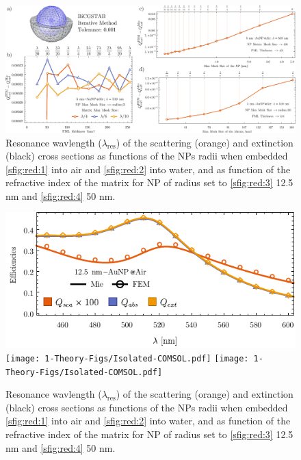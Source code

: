 

\begin{figure}\centering
\includegraphics[scale = .8 ]{1-Theory-Figs/drawingCOMSOL.pdf}
\caption[Convergence tests: The Meshing]{Resonance wavlength ($\lambda_\text{res}$) of the scattering (orange) and extinction (black) cross sections as functions of the NPs radii when embedded  \ref{sfig:red:1} into air and \ref{sfig:red:2} into water, and as function of the refractive index of the matrix for NP of radius set to  \ref{sfig:red:3} 12.5 nm and \ref{sfig:red:4} 50 nm.}
\end{figure}

\clearpage

\begin{figure}\centering
\includegraphics[width = .8\textwidth ]{1-Theory-Figs/Mie-FEM_Air.pdf}\\
\texttt{[image: 1-Theory-Figs/Isolated-COMSOL.pdf]}%
\texttt{[image: 1-Theory-Figs/Isolated-COMSOL.pdf]}%
\caption[Convergence tests: The Meshing]{Resonance wavlength ($\lambda_\text{res}$) of the scattering (orange) and extinction (black) cross sections as functions of the NPs radii when embedded  \ref{sfig:red:1} into air and \ref{sfig:red:2} into water, and as function of the refractive index of the matrix for NP of radius set to  \ref{sfig:red:3} 12.5 nm and \ref{sfig:red:4} 50 nm.}
\end{figure}
































